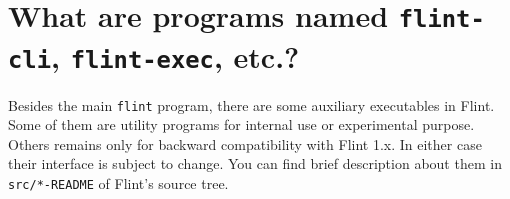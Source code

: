 \documentclass[a4paper,10pt]{report}
\newcommand{\filename}[1]{{\tt #1}}
\begin{document}
\section{What are programs named \filename{flint-cli}, \filename{flint-exec}, etc.?}
Besides the main \filename{flint} program, there are some auxiliary executables in
Flint. Some of them are utility programs for internal use or experimental
purpose. Others remains only for backward compatibility with Flint 1.x. In
either case their interface is subject to change. You can find brief description about
them in \filename{src/*-README} of Flint's source tree.




\end{document}
